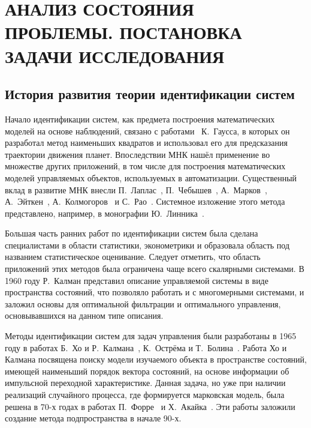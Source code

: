 \chapter[Анализ состояния проблемы. Постановка задачи исследования]{%
  АНАЛИЗ СОСТОЯНИЯ ПРОБЛЕМЫ. \hspace{2cm}
  ПОСТАНОВКА ЗАДАЧИ ИССЛЕДОВАНИЯ
}

\section{История развития теории идентификации систем}

Начало идентификации систем, как предмета построения математических моделей на основе наблюдений,
связано с работами~\cite{gauss_1809, gauss_1810, gauss_1821} К.~Гаусса,
в которых он разработал метод наименьших квадратов и использовал его для предсказания
траектории движения планет.
Впоследствии МНК нашёл применение во множестве других приложений,
в том числе для построения математических моделей управляемых объектов,
используемых в автоматизации.
Существенный вклад в развитие МНК внесли
П.~Лаплас~\cite{laplace_1812},
П.~Чебышев~\cite{chebyshev_1859},
А.~Марков~\cite{markov_1898},
А.~Эйткен~\cite{aitken_1935},
А.~Колмогоров~\cite{kolmogorov_1946} и
С.~Рао~\cite{rao_1946}.
Системное изложение этого метода представлено, например, в монографии Ю.~Линника~\cite{linnik62}.

Большая часть ранних работ по идентификации систем была сделана специалистами в области статистики,
эконометрики и образовала область под названием статистическое оценивание.
Следует отметить, что область приложений этих методов была ограничена чаще всего скалярными системами.
В 1960 году Р.~Калман представил описание управляемой системы в виде пространства состояний,
что позволяло работать и с многомерными системами,
и заложил основы для оптимальной фильтрации и оптимального управления,
основывавшихся на данном типе описания.

Методы идентификации систем для задач управления были разработаны в 1965 году в работах
Б.~Хо и Р.~Калмана~\cite{ho_1965}, К.~Острёма и Т.~Болина~\cite{astrom_1965}.
Работа Хо и Калмана посвящена поиску модели изучаемого объекта в пространстве состояний,
имеющей наименьший порядок вектора состояний,
на основе информации об импульсной переходной характеристике.
Данная задача, но уже при наличии реализаций случайного процесса, где формируется марковская модель,
была решена в 70-х годах в работах П.~Форре~\cite{faurre_1973} и Х.~Акайка~\cite{akaike_1974}.
Эти работы заложили создание метода подпространства в начале 90-х.

